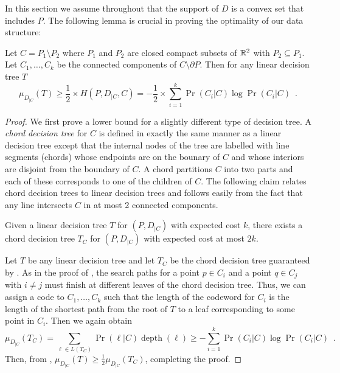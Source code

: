 \documentclass[charterfonts,lotsofwhite]{patmorin}
\DeclareMathOperator{\depth}{depth}
\begin{document}
In this section we assume throughout that the support of $D$ is a
convex set that includes $P$.  The following lemma is crucial in
proving the optimality of our data structure:

\begin{lem}
Let $C=P_1\setminus P_2$ where $P_1$ and $P_2$ are closed compact
subsets of $\mathbb{R}^2$ with $P_2\subseteq P_1$.  Let $C_1,\ldots,C_k$ be
the connected components of $C\setminus\partial P$.  Then for any
linear decision tree $T$
\[
	\mu_{D_{|C}}(T) \ge \frac{1}{2}\times H(P,D_{|C},C) 
		= -\frac{1}{2}
			\times \sum_{i=1}^k \Pr(C_i|C)\log \Pr(C_i|C)
		\enspace .
\]
\end{lem}

\begin{proof} 
We first prove a lower bound for  a slightly different type of
decision tree.  A \emph{chord decision tree} for $C$ is defined in
exactly the same manner as a linear decision tree except that the
internal nodes of the tree are labelled with line segments (chords)
whose endpoints are on the bounary of $C$ and whose interiors are
disjoint from the boundary of $C$.  A chord partitions $C$ into two
parts and each of these corresponds to one of the children of $C$.
The following claim relates chord decision trees to linear decision
trees and follows easily from the fact that any line intersects $C$ in
at most 2 connected components.

\begin{clm}
Given a linear decision tree $T$ for $(P,D_{|C})$ with expected cost $k$,
there exists a chord decision tree $T_C$ for $(P,D_{|C})$ with expected cost
at most $2k$. 
\end{clm}

Let $T$ be any linear decision tree and let $T_C$ be the chord
decision tree guaranteed by .  As in the proof of
, the search paths for a point $p\in C_i$ and a
point $q\in C_j$ with $i\neq j$ must finish at different leaves of the
chord decision tree.  Thus, we can assign a code to $C_1,\ldots,C_k$
such that the length of the codeword for $C_i$ is the length of the
shortest path from the root of $T$ to a leaf corresponding to some
point in $C_i$.  Then we again obtain
\[
  \mu_{D_{|C}}(T_C)
	= \sum_{\ell\in L(T_C)} \Pr(\ell|C)\depth(\ell) 
	\ge -\sum_{i=1}^k \Pr(C_i|C)\log\Pr(C_i|C) \enspace .
\]
Then, from , $\mu_{D_{|C}}(T) \ge
\frac{1}{2}\mu_{D_{|C}}(T_C)$, completing the proof.
\end{proof}
\end{document}

